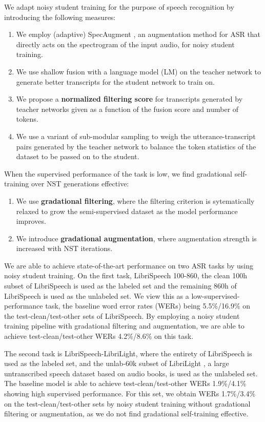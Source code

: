 \documentclass[a4paper]{article}
\begin{document}
We adapt noisy student training for the purpose of speech recognition by introducing the following measures:
\begin{enumerate}
\item We employ (adaptive) SpecAugment \cite{specaugment, largespecaugment}, an augmentation method for ASR that directly acts on the spectrogram of the input audio, for noisy student training.
\item We use shallow fusion with a language model (LM) \cite{shallowfusion} on the teacher network to generate better transcripts for the student network to train on.
\item We propose a \textbf{normalized filtering score} for transcripts generated by teacher networks given as a function of the fusion score and number of tokens.
\item We use a variant of sub-modular sampling \cite{shinohara2014} to weigh the utterance-transcript pairs generated by the teacher network to balance the token statistics of the dataset to be passed on to the student.
\end{enumerate}
When the supervised performance of the task is low, we find {gradational self-training} over NST generations effective:
\begin{enumerate}
\item We use \textbf{gradational filtering}, where the filtering criterion is sytematically relaxed to grow the semi-supervised dataset as the model performance improves.
\item We introduce \textbf{gradational augmentation}, where augmentation strength is increased with NST iterations.
\end{enumerate}

We are able to achieve state-of-the-art performance on two ASR tasks by using noisy student training. On the first task, LibriSpeech 100-860, the clean 100h subset of LibriSpeech \cite{librispeech} is used as the labeled set and the remaining 860h of LibriSpeech is used as the unlabeled set. We view this as a low-supervised-performance task, the baseline word error rates (WERs) being 5.5\%/16.9\% on the test-clean/test-other sets of LibriSpeech. By employing a noisy student training pipeline with gradational filtering and augmentation, we are able to achieve test-clean/test-other WERs 4.2\%/8.6\% on this task.

The second task is LibriSpeech-LibriLight, where the entirety of LibriSpeech is used as the labeled set, and the unlab-60k subset of LibriLight \cite{librilight}, a large untranscribed speech dataset based on audio books, is used as the unlabeled set. The baseline model \cite{han2020CNN} is able to achieve test-clean/test-other WERs 1.9\%/4.1\% showing high supervised performance. For this set, we obtain WERs 1.7\%/3.4\% on the test-clean/test-other sets by noisy student training without gradational filtering or augmentation, as we do not find gradational self-training effective.
\end{document}
